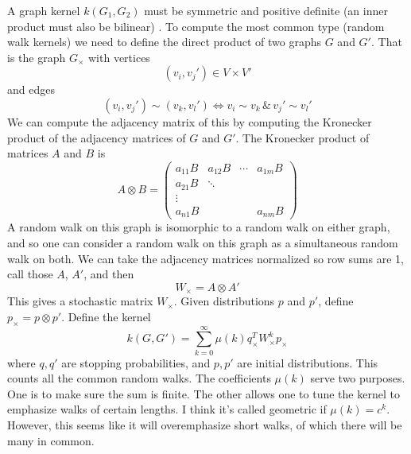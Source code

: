 \documentclass[10pt]{article}
\theoremstyle{definition}
\numberwithin{theorem}{section}
\numberwithin{definition}{section}
\numberwithin{lemma}{section}
\numberwithin{corollary}{section}
\numberwithin{clm}{section}
\numberwithin{rmk}{section}
\begin{document}
A graph kernel $k(G_1,G_2)$ must be symmetric and positive definite (an inner product must also be bilinear) \cite{Vishwanathan}. To compute the most common type (random walk kernels) we need to define the direct product of two graphs $G$ and $G'$. That is the graph $G_{\times}$ with vertices 
\[
(v_i,v_j') \in V \times V'
\]
and edges
\[
(v_i,v_j') \sim (v_k,v_l') \Leftrightarrow v_i \sim v_k \, \&\, v_j' \sim v_l'
\]
We can compute the adjacency matrix of this by computing the Kronecker product of the adjacency matrices of $G$ and $G'$. The Kronecker product of matrices $A$ and $B$ is
\[
A \otimes B = \begin{pmatrix}
a_{11} B & a_{12}B & \cdots & a_{1m}B\\
a_{21}B & \ddots & &\\
\vdots & & & \\
a_{n1}B & & & a_{nm}B
\end{pmatrix}
\]
A random walk on this graph is isomorphic to a random walk on either graph, and so one can consider a random walk on this graph as a simultaneous random walk on both. We can take the adjacency matrices normalized so row sums are 1, call those $A$, $A'$, and then
\[
W_{\times}  = A \otimes A'
\] 
This gives a stochastic matrix $W_{\times}$. Given distributions $p$ and $p'$, define $p_{\times}  = p \otimes p'$. Define the kernel
\[
k(G,G') = \sum_{k=0}^{\infty} \mu(k) q_{\times}^T W_{\times}^k p_{\times}
\]
where $q,q'$ are stopping probabilities, and $p,p'$ are initial distributions. This counts all the common random walks. The coefficients $\mu(k)$ serve two purposes. One is to make sure the sum is finite. The other allows one to tune the kernel to emphasize walks of certain lengths. I think it's called geometric if $\mu(k) = c^k$. However, this seems like it will overemphasize short walks, of which there will be many in common.

	


\end{document}
